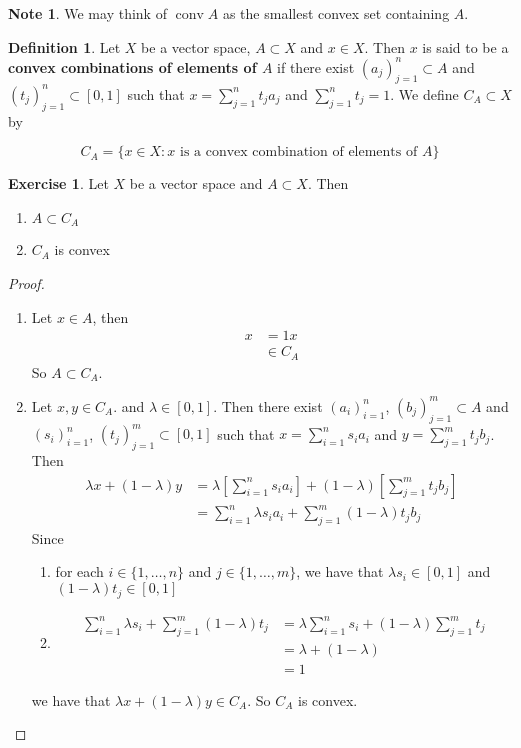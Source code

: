 \documentclass[12pt]{amsart}
\theoremstyle{definition}
\newtheorem{defn}[definition]{Definition}
\newtheorem{note}[definition]{Note}
\newtheorem{ex}[definition]{Exercise}
\newcommand{\lam}{\lambda}
\DeclareMathOperator{\cnv}{conv}
\begin{document}
	\begin{note}
		We may think of $\cnv A$ as the smallest convex set containing $A$. 
	\end{note}

	\begin{defn}
		Let $X$ be a vector space, $A \subset X$ and $x \in X$. Then $x$ is said to be a \textbf{convex combinations of elements of $A$} if there exist $(a_j)_{j=1}^n \subset A$ and $(t_j)_{j=1}^n \subset [0,1]$ such that $x = \sum\limits_{j=1}^n t_j a_j$ and $\sum\limits_{j=1}^n t_j = 1$. We define $C_A \subset X$ by 
		
		$$C_A = \{x \in X:\text{$x$ is a convex combination of elements of $A$}\}$$
	\end{defn}

	\begin{ex}
		Let $X$ be a vector space and $A \subset X$. 
 		Then 
 		\begin{enumerate}
 			\item $A \subset C_A$
 			\item $C_A$ is convex 
 		\end{enumerate}
	\end{ex}

	\begin{proof}\
		\begin{enumerate}
			\item Let $x \in A$, then 
			\begin{align*}
				x 
				&= 1x \\
				& \in C_A 
			\end{align*}
			So $A \subset C_A$.\\
			\item Let $x, y \in C_A$. and $\lam \in [0,1]$. Then there exist $(a_i)_{i=1}^n$, $(b_j)_{j=1}^m \subset A$ and $(s_i)_{i=1}^n$, $(t_j)_{j=1}^m \subset [0,1]$ such that $x = \sum\limits_{i=1}^n s_i a_i$ and $y = \sum\limits_{j=1}^m t_j b_j$. Then
			\begin{align*}
				\lam x + (1-\lam)y 
				&= \lam [\sum\limits_{i=1}^n s_i a_i] + (1-\lam)[\sum\limits_{j=1}^m t_j b_j] \\
				&= \sum\limits_{i=1}^n \lam s_i a_i + \sum\limits_{j=1}^m (1-\lam) t_j b_j
			\end{align*}
			Since 
			\begin{enumerate}
				\item for each $i \in \{1, \ldots, n\}$ and $j \in \{1, \ldots, m\}$, we have that $\lam s_i \in [0,1]$ and $(1-\lam)t_j \in [0,1]$
				\item 
				\begin{align*}
					\sum\limits_{i=1}^n \lam s_i + \sum\limits_{j=1}^m (1-\lam) t_j
					&= \lam \sum\limits_{i=1}^n s_i +  (1-\lam) \sum\limits_{j=1}^m  t_j \\
					&= \lam + (1-\lam) \\
					&= 1
				\end{align*}
			\end{enumerate}
			we have that $\lam x+(1-\lam) y \in C_A$. So $C_A$ is convex.
		\end{enumerate}
	\end{proof}
\end{document}
